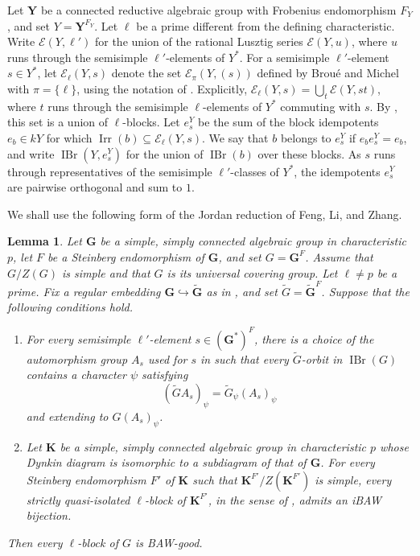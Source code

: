 \documentclass[10pt]{amsart}
\newtheorem{lemma}[theorem]{Lemma}
\theoremstyle{definition}
\DeclareMathOperator{\IBr}{IBr}
\DeclareMathOperator{\Irr}{Irr}
\numberwithin{equation}{section}
\numberwithin{table}{section}
\begin{document}
Let $\mathbf Y$ be a connected reductive algebraic group with Frobenius
endomorphism $F_Y$, and set $Y=\mathbf Y^{F_Y}$. Let $\ell$ be a prime
different from the defining characteristic. Write $\mathcal E(Y,\ell')$
for the union of the rational Lusztig series $\mathcal E(Y,u)$, where
$u$ runs through the semisimple $\ell'$-elements of $Y^*$.  For a
semisimple $\ell'$-element $s\in Y^*$, let $\mathcal E_\ell(Y,s)$ denote
the set $\mathcal E_\pi(Y,(s))$ defined by Brou\'e and Michel
\cite[Section~2]{BroueMichel1989} with $\pi=\{\ell\}$, using the notation
of \cite[Section~2.3]{FengLiZhang2019}. Explicitly,
$\mathcal E_\ell(Y,s)=\bigcup_t\mathcal E(Y,st)$, where $t$ runs through
the semisimple $\ell$-elements of $Y^*$ commuting with $s$. By
\cite[Theorem~2.2]{BroueMichel1989}, this set is a union of $\ell$-blocks.
Let $e_s^Y$ be the sum of the block idempotents $e_b\in kY$ for
which $\Irr(b)\subseteq\mathcal E_\ell(Y,s)$.
We say that $b$ belongs to $e_s^Y$ if $e_be_s^Y=e_b$, and write
$\IBr(Y,e_s^Y)$ for the union of $\IBr(b)$ over these blocks.
As $s$ runs through representatives of the semisimple $\ell'$-classes
of $Y^*$, the idempotents $e_s^Y$ are pairwise orthogonal and sum to $1$.

We shall use the following form of the Jordan reduction of Feng, Li, and
Zhang.

\begin{lemma}\label{lem:jordan-reduction}
Let $\mathbf G$ be a simple, simply connected algebraic group in
characteristic $p$, let $F$ be a Steinberg endomorphism of $\mathbf G$,
and set $G=\mathbf G^F$.  Assume that $G/Z(G)$ is simple and that $G$
is its universal covering group.  Let $\ell\neq p$ be a prime.
Fix a regular embedding $\mathbf G\hookrightarrow\widetilde{\mathbf G}$
as in \cite[Section~5]{FengLiZhang2022Jordan}, and set
$\widetilde G=\widetilde{\mathbf G}^F$.
Suppose that the following conditions hold.
\begin{enumerate}[label=\textup{(\roman*)}]
\item For every semisimple $\ell'$-element $s\in(\mathbf G^*)^F$, there
is a choice of the automorphism group $A_s$ used for $s$ in
\cite[Section~5]{FengLiZhang2022Jordan} such that every
$\widetilde G$-orbit in $\IBr(G)$ contains a character $\psi$ satisfying
\[
 (\widetilde G A_s)_\psi=\widetilde G_\psi(A_s)_\psi
\]
and extending to $G(A_s)_\psi$.
\item Let $\mathbf K$ be a simple, simply connected algebraic group
in characteristic $p$ whose Dynkin diagram is isomorphic to a
subdiagram of that of $\mathbf G$.  For every Steinberg endomorphism
$F'$ of $\mathbf K$ such that $\mathbf K^{F'}/Z(\mathbf K^{F'})$ is
simple, every strictly quasi-isolated $\ell$-block of $\mathbf K^{F'}$,
in the sense of \cite[Section~4.3]{FengLiZhang2022Jordan}, admits
an iBAW bijection.
\end{enumerate}
Then every $\ell$-block of $G$ is BAW-good.
\end{lemma}
\end{document}
